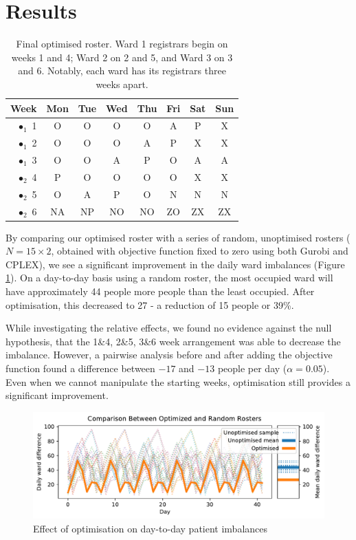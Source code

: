 \documentclass[a4paper]{article}
\begin{document}
\section{Results}
\begin{table}[H]
\centering
\caption{Final optimised roster. Ward 1 registrars begin on weeks 1 and 4; Ward 2 on 2 and 5, and Ward 3 on 3 and 6. Notably, each ward has its registrars three weeks apart.}
\label{tab:roster}
\begin{tabular}{r|ccccccc}
Week & Mon & Tue & Wed & Thu & Fri & Sat & Sun \\
\hline
{\color{lime}$\bullet_1$}	 1	& O	& O	& O	& O	& A	& P	& X	\\
{\color{navy}$\bullet_1$}	 2	& O	& O	& O	& A	& P	& X	& X	\\
{\color{yellow}$\bullet_1$}	 3	& O	& O	& A	& P	& O	& A	& A	\\
{\color{lime}$\bullet_2$}	 4	& P	& O	& O	& O	& O	& X	& X	\\
{\color{navy}$\bullet_2$}	 5	& O	& A	& P	& O	& N	& N	& N	\\
{\color{yellow}$\bullet_2$}	 6	& NA	& NP	& NO	& NO	& ZO	& ZX	& ZX	\\
\end{tabular}
\end{table}

By comparing our optimised roster with a series of random, unoptimised rosters ($N=15\times 2$, obtained with objective function fixed to zero using both Gurobi and CPLEX), we see a significant improvement in the daily ward imbalances (Figure \ref{fig:comparison}). On a day-to-day basis using a random roster, the most occupied ward will have approximately 44 people more people than the least occupied. After optimisation, this decreased to 27 - a reduction of 15 people or 39\%.

While investigating the relative effects, we found no evidence against the null hypothesis, that the 1\&4, 2\&5, 3\&6 week arrangement was able to decrease the imbalance. However, a pairwise analysis before and after adding the objective function found a difference between $-17$ and $-13$ people per day ($\alpha = 0.05$). Even when we cannot manipulate the starting weeks, optimisation still provides a significant improvement.

\begin{figure}[h]
    \centering\includegraphics[width=\linewidth]{../results/comparison}
    \caption{Effect of optimisation on day-to-day patient imbalances}
    \label{fig:comparison}
\end{figure}
\end{document}
